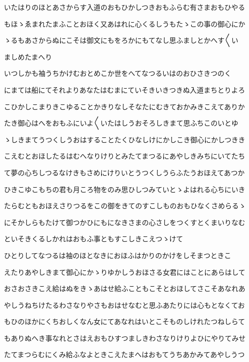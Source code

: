 \documentclass[a4paper,11pt,landscape]{ltjtarticle}
\begin{document}
いたはりのほとあさからす入道のおもひかしつきおもふらむ有さまおもひやる
\par\medskip
もほゝゑまれたまふことおほく又あはれに心くるしうもたゝこの事の御心にか
\par\medskip
ゝるもあさからぬにこそは御文にもをろかにもてなし思ふましとかへす〱い
\par\medskip
ましめたまへり
\par\medskip
いつしかも袖うちかけむおとめこか世をへてなつるいはのおひさきつのく
\par\medskip
にまては船にてそれよりあなたはむまにていそきいきつきぬ入道まちとりよろ
\par\medskip
こひかしこまりきこゆることかきりなしそなたにむきておかみきこえてありか
\par\medskip
たき御心はへをおもふにいよ〱いたはしうおそろしきまて思ふちこのいとゆ
\par\medskip
ゝしきまてうつくしうおはすることたくひなしけにかしこき御心にかしつきき
\par\medskip
こえむとおほしたるはむへなりけりとみたてまつるにあやしきみちにいてたち
\par\medskip
て夢の心ちしつるなけきもさめにけりいとうつくしうらふたうおほえてあつか
\par\medskip
ひきこゆこもちの君も月ころ物をのみ思ひしつみていとゝよはれる心ちにいき
\par\medskip
たらむともおほえさりつるをこの御をきてのすこしものおもひなくさめらるゝ
\par\medskip
にそかしらもたけて御つかひにもになきさまの心さしをつくすとくまいりなむ
\par\medskip
といそきくるしかれはおもふ事ともすこしきこえつゝけて
\par\medskip
ひとりしてなつるは袖のほとなきにおほふはかりのかけをしそまつときこ
\par\medskip
えたりあやしきまて御心にかゝりゆかしうおほさる女君にはことにあらはして
\par\medskip
おさおさきこえ給はぬをきゝあはせ給ふこともこそとおほしてさこそあなれあ
\par\medskip
やしうねちけたるわさなりやさもおはせなむと思ふあたりには心もとなくてお
\par\medskip
もひのほかにくちおしくなん女にてあなれはいとこそものしけれたつねしらて
\par\medskip
もありぬへき事なれとさはえおもひすつましきわさなりけりよひにやりてみせ
\par\medskip
たてまつらむにくみ給ふなよときこえたまへはおもてうちあかみてあやしうつ
\par\medskip
\end{document}
